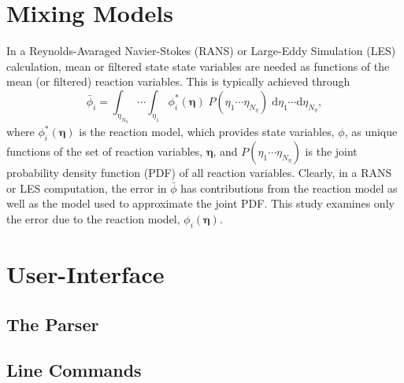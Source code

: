 \documentclass[10pt]{book}
\begin{document}
\chapter{Mixing Models}
In a Reynolds-Avaraged Navier-Stokes (RANS) or Large-Eddy Simulation
(LES) calculation, mean or filtered state state variables are needed as
functions of the mean (or filtered) reaction variables.  This is
typically achieved through
\begin{equation}
  \bar{\phi}_i = \int_{\eta_{N_\eta}} \cdots \int_{\eta_1}
  \phi_i^\ast(\boldsymbol{\eta}) \; P(\eta_1 \cdots \eta_{N_\eta}) \;
  \mathrm{d} \eta_1 \cdots \mathrm{d} \eta_{N_\eta},
\end{equation}
where $\phi_i^\ast(\boldsymbol{\eta})$ is the reaction model, which
provides state variables, $\phi$, as unique functions of the set
of reaction variables, $\boldsymbol{\eta}$, and $P(\eta_1 \cdots
\eta_{N_\eta})$ is the joint probability density function (PDF) of all
reaction variables.  Clearly, in a RANS or LES computation, the error
in $\bar{\phi}$ has contributions from the reaction model as well as
the model used to approximate the joint PDF.  This study examines only
the error due to the reaction model, $\phi_i(\boldsymbol{\eta})$.


\chapter{User-Interface}
\section{The Parser}

\section{Line Commands}


\end{document}
